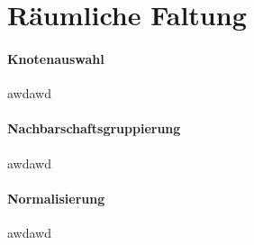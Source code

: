 \section{Räumliche Faltung}
\label{raeumliche_faltung}


\paragraph{Knotenauswahl}
\label{knotenauswahl}

awdawd

\paragraph{Nachbarschaftsgruppierung}
\label{nachbarschaftsgruppierung}

awdawd

\paragraph{Normalisierung}
\label{normalisierung}

awdawd
